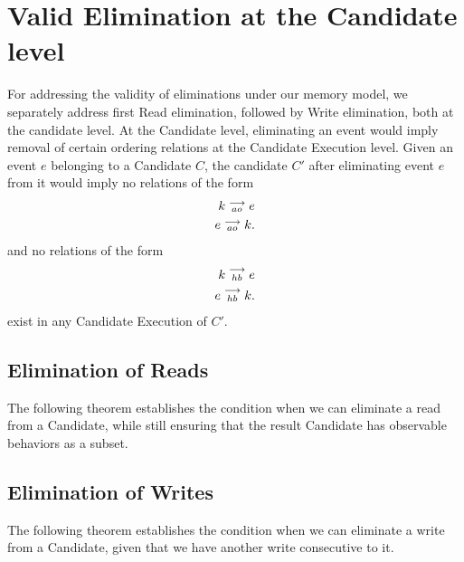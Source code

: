 \section{Valid Elimination at the Candidate level}

    For addressing the validity of eliminations under our memory model, we separately address first Read elimination, followed by Write elimination, both at the candidate level. 
    At the Candidate level, eliminating an event would imply removal of certain ordering relations at the Candidate Execution level. 
    Given an event $e$ belonging to a Candidate $C$, the candidate $C'$ after eliminating event $e$ from it would imply no relations of the form 
    \begin{align*}
        k\stackrel{\longrightarrow}{_{ao}}e \\  
        e\stackrel{\longrightarrow}{_{ao}}k.
    \end{align*}
    and no relations of the form
    \begin{align*}
        k\stackrel{\longrightarrow}{_{hb}}e \\
        e\stackrel{\longrightarrow}{_{hb}}k.
    \end{align*}
    exist in any Candidate Execution of $C'$.
    
    \subsection{Elimination of Reads}

        The following theorem establishes the condition when we can eliminate a read from a Candidate, while still ensuring that the result Candidate has observable behaviors as a subset. 
        

    \subsection{Elimination of Writes}

        The following theorem establishes the condition when we can eliminate a write from a Candidate, given that we have another write consecutive to it.  
        
    